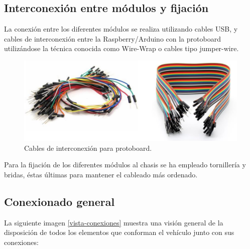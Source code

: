\subsection{Interconexión entre módulos y fijación}

La conexión entre los diferentes módulos se realiza utilizando cables USB, y cables de interconexión entre la Raspberry/Arduino con la protoboard utilizándose la técnica
conocida como Wire-Wrap o cables tipo jumper-wire.\\

\begin{figure}[H]
  \begin{center}
    \includegraphics[scale=0.3]{imagenes/cables_interconexion.png}
  \end{center}
  \caption{Cables de interconexión para protoboard.}
  \label{figura:cables_interconexion}
\end{figure}

Para la fijación de los diferentes módulos al chasis se ha empleado tornillería y bridas, éstas últimas para mantener el cableado más ordenado.\\

\subsection{Conexionado general}

La siguiente imagen \ref{vista-conexiones} muestra una visión general de la disposición de todos los elementos que conforman el vehículo junto con sus conexiones:\\


